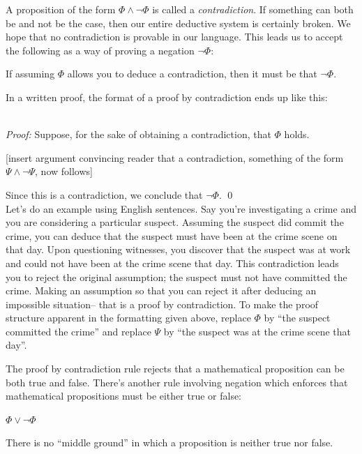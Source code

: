 \documentclass[12pt]{article}
\newcommand{\done}{\\\hspace*{0pt}\hfill$\blacksquare$}
\newcommand{\AND}{\wedge}
\newcommand{\OR}{\vee}
\newcounter{rule}
\newcounter{theorem}
\def\putRuleNumber{\refstepcounter{rule}\therule}
\newcommand{\indented}[1]{\begin{adjustwidth}{1em}{}#1\end{adjustwidth}}
\def\thmcolonspace{\hspace{0.2em}}
\def\proofnewline{\\[0.75em]} %
\def\done{\qed\\[0em]} %
\newcommand{\thmbox}[1]{\fbox{\parbox{\textwidth}{{#1}}}}
\newcommand{\THMMOCK}[2]{\thmbox{\textbf{Theorem:} \thmcolonspace #1} \proofnewline \textit{Proof:} #2\done}
\newcommand{\RULE}[2]{\begin{tcolorbox}[title=Rule \putRuleNumber: #1,colbacktitle=white,coltitle=black,colback=white]#2\end{tcolorbox}}
\def\pA{\Phi}
\def\pB{\Psi}
\begin{document}
A proposition of the form $\pA\AND\neg\pA$ is called a \emph{contradiction}.
If something can both be and not be the case, then our entire deductive system is certainly broken.
We hope that no contradiction is provable in our language.
\hypertarget{hl:NOTPV}{This} leads us to accept the following as a way of proving a negation $\neg\pA$:
\RULE{Proof by contradiction}{
If assuming $\pA$ allows you to deduce a contradiction, then it must be that $\neg\pA$.
}
In a written proof, the format of a proof by contradiction ends up like this:

\THMMOCK{$\neg\pA$.}{
Suppose, for the sake of obtaining a contradiction, that $\pA$ holds.
\indented{[insert argument convincing reader that a contradiction, something of the form $\pB\AND\neg\pB$, now follows]}
Since this is a contradiction, we conclude that $\neg\pA$.
}

Let's do an example using English sentences.
Say you're investigating a crime and you are considering a particular suspect.
Assuming the suspect did commit the crime, you can deduce that the suspect must have been at the crime scene on that day.
Upon questioning witnesses, you discover that the suspect was at work and could not have been at the crime scene that day.
This contradiction leads you to reject the original assumption; the suspect must not have committed the crime.
Making an assumption so that you can reject it after deducing an impossible situation-- that is a proof by contradiction.
To make the proof structure apparent in
the formatting given above, replace
$\pA$ by ``the suspect committed the crime'' and replace $\pB$ by ``the suspect was at the crime scene that day''.


The proof by contradiction rule rejects that a mathematical proposition can be both true and false.
There's
another rule involving negation which
enforces that mathematical propositions must be either true or false:
\RULE{Excluded middle}{
$\pA\OR\neg\pA$
}
There is no ``middle ground'' in which a proposition is neither true nor false.
\end{document}
